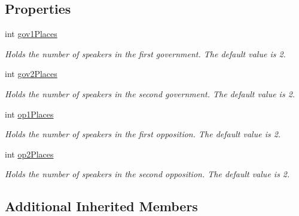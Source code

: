 \subsection*{Properties}
\begin{DoxyCompactItemize}
\item 
\hypertarget{classBPSDebate_aff0bc6617abe4eb69e9ddef87a0ad021}{int \hyperlink{classBPSDebate_aff0bc6617abe4eb69e9ddef87a0ad021}{gov1\-Places}}\label{classBPSDebate_aff0bc6617abe4eb69e9ddef87a0ad021}

\begin{DoxyCompactList}\small\item\em Holds the number of speakers in the first government. The default value is 2. \end{DoxyCompactList}\item 
\hypertarget{classBPSDebate_adc50f853f398e82b65bb5013cc8f6ccc}{int \hyperlink{classBPSDebate_adc50f853f398e82b65bb5013cc8f6ccc}{gov2\-Places}}\label{classBPSDebate_adc50f853f398e82b65bb5013cc8f6ccc}

\begin{DoxyCompactList}\small\item\em Holds the number of speakers in the second government. The default value is 2. \end{DoxyCompactList}\item 
\hypertarget{classBPSDebate_a299bc40d5f80b2d4066c7869f56c70ba}{int \hyperlink{classBPSDebate_a299bc40d5f80b2d4066c7869f56c70ba}{op1\-Places}}\label{classBPSDebate_a299bc40d5f80b2d4066c7869f56c70ba}

\begin{DoxyCompactList}\small\item\em Holds the number of speakers in the first opposition. The default value is 2. \end{DoxyCompactList}\item 
\hypertarget{classBPSDebate_a98039d27d11878e68c88d41570553eae}{int \hyperlink{classBPSDebate_a98039d27d11878e68c88d41570553eae}{op2\-Places}}\label{classBPSDebate_a98039d27d11878e68c88d41570553eae}

\begin{DoxyCompactList}\small\item\em Holds the number of speakers in the second opposition. The default value is 2. \end{DoxyCompactList}\end{DoxyCompactItemize}
\subsection*{Additional Inherited Members}


